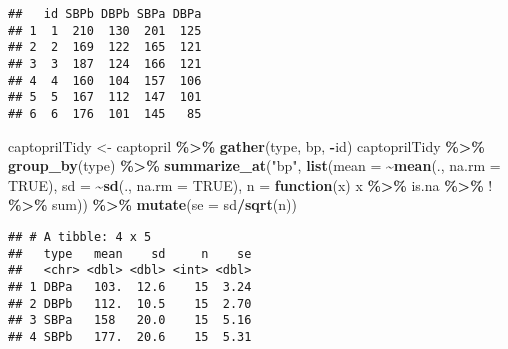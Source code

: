 \documentclass[
  12pt,dutch,coursenotes]{book}
\newenvironment{Shaded}{\begin{snugshade}}{\end{snugshade}}
\newcommand{\ControlFlowTok}[1]{\textcolor[rgb]{0.13,0.29,0.53}{\textbf{#1}}}
\newcommand{\DataTypeTok}[1]{\textcolor[rgb]{0.13,0.29,0.53}{#1}}
\newcommand{\KeywordTok}[1]{\textcolor[rgb]{0.13,0.29,0.53}{\textbf{#1}}}
\newcommand{\NormalTok}[1]{#1}
\newcommand{\OperatorTok}[1]{\textcolor[rgb]{0.81,0.36,0.00}{\textbf{#1}}}
\newcommand{\OtherTok}[1]{\textcolor[rgb]{0.56,0.35,0.01}{#1}}
\newcommand{\StringTok}[1]{\textcolor[rgb]{0.31,0.60,0.02}{#1}}
\theoremstyle{definition}
\theoremstyle{definition}
\theoremstyle{definition}
\theoremstyle{remark}
\begin{document}
\begin{verbatim}
##   id SBPb DBPb SBPa DBPa
## 1  1  210  130  201  125
## 2  2  169  122  165  121
## 3  3  187  124  166  121
## 4  4  160  104  157  106
## 5  5  167  112  147  101
## 6  6  176  101  145   85
\end{verbatim}

\begin{Shaded}
\begin{Highlighting}[]
\NormalTok{captoprilTidy \textless{}{-}}\StringTok{ }\NormalTok{captopril }\OperatorTok{\%\textgreater{}\%}\StringTok{ }\KeywordTok{gather}\NormalTok{(type, bp, }\OperatorTok{{-}}\NormalTok{id)}
\NormalTok{captoprilTidy }\OperatorTok{\%\textgreater{}\%}\StringTok{ }\KeywordTok{group\_by}\NormalTok{(type) }\OperatorTok{\%\textgreater{}\%}\StringTok{ }\KeywordTok{summarize\_at}\NormalTok{(}\StringTok{"bp"}\NormalTok{, }
    \KeywordTok{list}\NormalTok{(}\DataTypeTok{mean =} \OperatorTok{\textasciitilde{}}\KeywordTok{mean}\NormalTok{(., }\DataTypeTok{na.rm =} \OtherTok{TRUE}\NormalTok{), }\DataTypeTok{sd =} \OperatorTok{\textasciitilde{}}\KeywordTok{sd}\NormalTok{(., }
        \DataTypeTok{na.rm =} \OtherTok{TRUE}\NormalTok{), }\DataTypeTok{n =} \ControlFlowTok{function}\NormalTok{(x) x }\OperatorTok{\%\textgreater{}\%}\StringTok{ }\NormalTok{is.na }\OperatorTok{\%\textgreater{}\%}\StringTok{ }
\StringTok{        \textasciigrave{}}\DataTypeTok{!}\StringTok{\textasciigrave{}} \OperatorTok{\%\textgreater{}\%}\StringTok{ }\NormalTok{sum)) }\OperatorTok{\%\textgreater{}\%}\StringTok{ }\KeywordTok{mutate}\NormalTok{(}\DataTypeTok{se =}\NormalTok{ sd}\OperatorTok{/}\KeywordTok{sqrt}\NormalTok{(n))}
\end{Highlighting}
\end{Shaded}

\begin{verbatim}
## # A tibble: 4 x 5
##   type   mean    sd     n    se
##   <chr> <dbl> <dbl> <int> <dbl>
## 1 DBPa   103.  12.6    15  3.24
## 2 DBPb   112.  10.5    15  2.70
## 3 SBPa   158   20.0    15  5.16
## 4 SBPb   177.  20.6    15  5.31
\end{verbatim}
\end{document}

